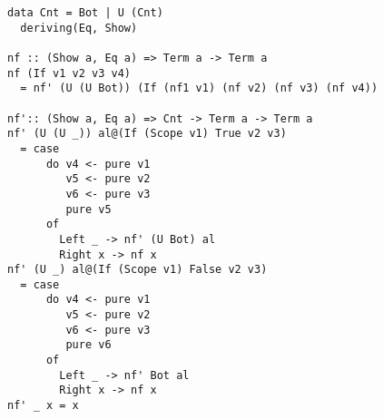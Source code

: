 \begin{lstlisting}[caption={Приведение в нормальную форму пытается применить все редукции данного функционального символа},captionpos=b, frame=single, float, floatplacement=H, label={lst_nf}]
data Cnt = Bot | U (Cnt)
  deriving(Eq, Show)

nf :: (Show a, Eq a) => Term a -> Term a
nf (If v1 v2 v3 v4)
  = nf' (U (U Bot)) (If (nf1 v1) (nf v2) (nf v3) (nf v4))

nf':: (Show a, Eq a) => Cnt -> Term a -> Term a
nf' (U (U _)) al@(If (Scope v1) True v2 v3)
  = case
      do v4 <- pure v1
         v5 <- pure v2
         v6 <- pure v3
         pure v5
      of
        Left _ -> nf' (U Bot) al
        Right x -> nf x
nf' (U _) al@(If (Scope v1) False v2 v3)
  = case
      do v4 <- pure v1
         v5 <- pure v2
         v6 <- pure v3
         pure v6
      of
        Left _ -> nf' Bot al
        Right x -> nf x
nf' _ x = x
\end{lstlisting}

